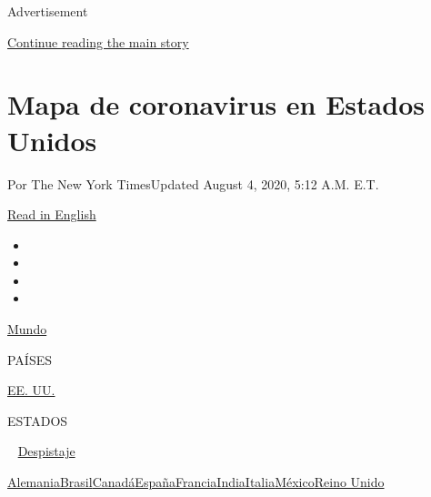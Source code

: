 Advertisement

\protect\hyperlink{after-top}{Continue reading the main story}

\hypertarget{mapa-de-coronavirus-en-estados-unidos}{%
\section{Mapa de coronavirus en Estados
Unidos}\label{mapa-de-coronavirus-en-estados-unidos}}

Por The New York TimesUpdated August 4, 2020, 5:12 A.M. E.T.

\href{https://www.nytimes3xbfgragh.onion/interactive/2020/us/coronavirus-us-cases.html}{Read
in English}

\begin{itemize}
\item
\item
\item
\item
\end{itemize}

\href{https://www.nytimes3xbfgragh.onion/interactive/2020/world/coronavirus-maps.html}{Mundo}~

PAÍSES

\textbar{}
\href{https://www.nytimes3xbfgragh.onion/es/interactive/2020/espanol/mundo/coronavirus-en-estados-unidos.html}{EE.
UU.}~

ESTADOS

~
\href{https://www.nytimes3xbfgragh.onion/interactive/2020/us/coronavirus-testing.html}{Despistaje}

\href{https://www.nytimes3xbfgragh.onion/interactive/2020/world/europe/germany-coronavirus-cases.html}{Alemania}\href{https://www.nytimes3xbfgragh.onion/interactive/2020/world/americas/brazil-coronavirus-cases.html}{Brasil}\href{https://www.nytimes3xbfgragh.onion/interactive/2020/world/canada/canada-coronavirus-cases.html}{Canadá}\href{https://www.nytimes3xbfgragh.onion/interactive/2020/world/europe/spain-coronavirus-cases.html}{España}\href{https://www.nytimes3xbfgragh.onion/interactive/2020/world/europe/france-coronavirus-cases.html}{Francia}\href{https://www.nytimes3xbfgragh.onion/interactive/2020/world/asia/india-coronavirus-cases.html}{India}\href{https://www.nytimes3xbfgragh.onion/interactive/2020/world/europe/italy-coronavirus-cases.html}{Italia}\href{https://www.nytimes3xbfgragh.onion/es/interactive/2020/espanol/america-latina/coronavirus-en-mexico.html}{México}\href{https://www.nytimes3xbfgragh.onion/interactive/2020/world/europe/united-kingdom-coronavirus-cases.html}{Reino
Unido}

